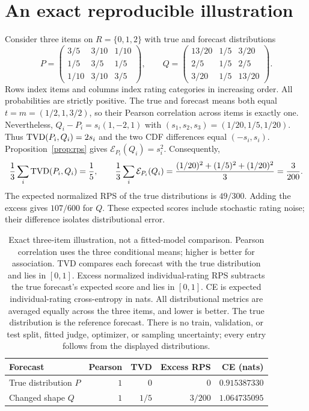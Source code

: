 \section{An exact reproducible illustration}\label{sec:example}
Consider three items on $R=\{0,1,2\}$ with true and forecast distributions
\begin{equation}\label{eq:example}
 P=\begin{pmatrix}
 3/5&3/10&1/10\\
 1/5&3/5&1/5\\
 1/10&3/10&3/5
 \end{pmatrix},\qquad
 Q=\begin{pmatrix}
 13/20&1/5&3/20\\
 2/5&1/5&2/5\\
 3/20&1/5&13/20
 \end{pmatrix}.
\end{equation}
Rows index items and columns index rating categories in increasing order.
All probabilities are strictly positive.
The true and forecast means both equal $t=m=(1/2,1,3/2)$, so their Pearson correlation across items is exactly one.
Nevertheless, $Q_i-P_i=s_i(1,-2,1)$ with $(s_1,s_2,s_3)=(1/20,1/5,1/20)$.
Thus $\operatorname{TVD}(P_i,Q_i)=2s_i$ and the two CDF differences equal $(-s_i,s_i)$.
Proposition~\ref{prop:rps} gives $\mathcal E_{P_i}(Q_i)=s_i^2$.
Consequently,
\[
 \frac13\sum_i\operatorname{TVD}(P_i,Q_i)=\frac15,\qquad
 \frac13\sum_i\mathcal E_{P_i}(Q_i)=\frac{(1/20)^2+(1/5)^2+(1/20)^2}{3}=\frac3{200}.
\]
The expected normalized RPS of the true distributions is $49/300$.
Adding the excess gives $107/600$ for $Q$.
These expected scores include stochastic rating noise; their difference isolates distributional error.

\begin{table}[ht]
\centering
\begin{tabular}{@{}lrrrr@{}}
\toprule
Forecast & Pearson & TVD & Excess RPS & CE (nats)\\
\midrule
True distribution $P$ & $1$ & $0$ & $0$ & $0.915387330$\\
Changed shape $Q$ & $1$ & $1/5$ & $3/200$ & $1.064735095$\\
\bottomrule
\end{tabular}
\caption{Exact three-item illustration, not a fitted-model comparison.
Pearson correlation uses the three conditional means; higher is better for association.
TVD compares each forecast with the true distribution and lies in $[0,1]$.
Excess normalized individual-rating RPS subtracts the true forecast's expected score and lies in $[0,1]$.
CE is expected individual-rating cross-entropy in nats.
All distributional metrics are averaged equally across the three items, and lower is better.
The true distribution is the reference forecast.
There is no train, validation, or test split, fitted judge, optimizer, or sampling uncertainty; every entry follows from the displayed distributions.}
\label{tab:exact}
\end{table}

